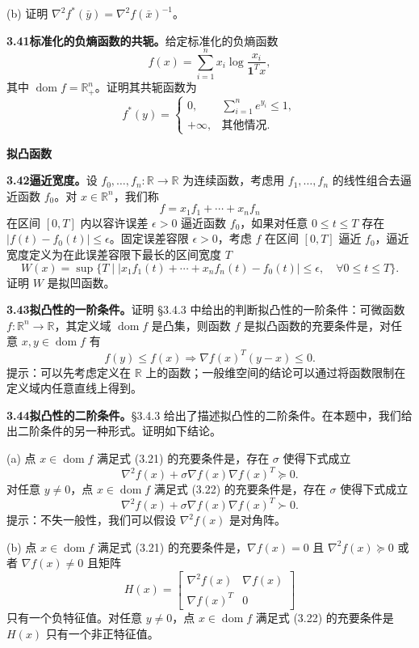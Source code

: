 \documentclass[UTF8,12pt,a4paper,fontset=fandol]{ctexart}
\DeclareMathOperator{\dom}{dom}
\begin{document}
(b) 证明 $\nabla^2 f^*(\bar y)=\nabla^2 f(\bar x)^{-1}$。

\noindent\textbf{3.41\quad 标准化的负熵函数的共轭。}\quad 给定标准化的负熵函数
\[
f(x)=\sum_{i=1}^n x_i\log\frac{x_i}{\mathbf{1}^Tx},
\]
其中 $\dom f=\mathbb{R}_+^n$。证明其共轭函数为
\[
f^*(y)=
\begin{cases}
0, & \sum_{i=1}^n e^{y_i}\leq1,\\
+\infty, & \text{其他情况}.
\end{cases}
\]

\noindent\textbf{拟凸函数}

\noindent\textbf{3.42\quad 逼近宽度。}\quad 设 $f_0,\ldots,f_n:\mathbb{R}\to\mathbb{R}$ 为连续函数，考虑用 $f_1,\ldots,f_n$ 的线性组合去逼近函数 $f_0$。对 $x\in\mathbb{R}^n$，我们称
\[
f=x_1f_1+\cdots+x_nf_n
\]
在区间 $[0,T]$ 内以容许误差 $\epsilon>0$ 逼近函数 $f_0$，如果对任意 $0\leq t\leq T$ 存在 $|f(t)-f_0(t)|\leq\epsilon$。固定误差容限 $\epsilon>0$，考虑 $f$ 在区间 $[0,T]$ 逼近 $f_0$，逼近宽度定义为在此误差容限下最长的区间宽度 $T$
\[
W(x)=\sup\{T\mid |x_1f_1(t)+\cdots+x_nf_n(t)-f_0(t)|\leq\epsilon,\quad \forall 0\leq t\leq T\}.
\]
证明 $W$ 是拟凹函数。

\noindent\textbf{3.43\quad 拟凸性的一阶条件。}\quad 证明 \S3.4.3 中给出的判断拟凸性的一阶条件：可微函数 $f:\mathbb{R}^n\to\mathbb{R}$，其定义域 $\dom f$ 是凸集，则函数 $f$ 是拟凸函数的充要条件是，对任意 $x,y\in\dom f$ 有
\[
f(y)\leq f(x)\Longrightarrow \nabla f(x)^T(y-x)\leq0.
\]
提示：可以先考虑定义在 $\mathbb{R}$ 上的函数；一般维空间的结论可以通过将函数限制在定义域内任意直线上得到。

\noindent\textbf{3.44\quad 拟凸性的二阶条件。}\quad \S3.4.3 给出了描述拟凸性的二阶条件。在本题中，我们给出二阶条件的另一种形式。证明如下结论。

(a) 点 $x\in\dom f$ 满足式 (3.21) 的充要条件是，存在 $\sigma$ 使得下式成立
\begin{equation}
\nabla^2 f(x)+\sigma\nabla f(x)\nabla f(x)^T\succeq0.
\tag{3.26}
\end{equation}
对任意 $y\neq0$，点 $x\in\dom f$ 满足式 (3.22) 的充要条件是，存在 $\sigma$ 使得下式成立
\begin{equation}
\nabla^2 f(x)+\sigma\nabla f(x)\nabla f(x)^T\succ0.
\tag{3.27}
\end{equation}
提示：不失一般性，我们可以假设 $\nabla^2 f(x)$ 是对角阵。

(b) 点 $x\in\dom f$ 满足式 (3.21) 的充要条件是，$\nabla f(x)=0$ 且 $\nabla^2 f(x)\succeq0$ 或者 $\nabla f(x)\neq0$ 且矩阵
\[
H(x)=
\begin{bmatrix}
\nabla^2 f(x) & \nabla f(x)\\
\nabla f(x)^T & 0
\end{bmatrix}
\]
只有一个负特征值。对任意 $y\neq0$，点 $x\in\dom f$ 满足式 (3.22) 的充要条件是 $H(x)$ 只有一个非正特征值。
\end{document}
